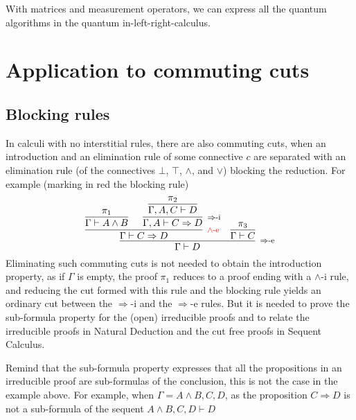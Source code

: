 \documentclass[screen, sigconf,authorversion,nonacm]{acmart}
\theoremstyle{acmdefinition}
\numberwithin{equation}{section}
\newcommand\irule[3]{\infer[\mbox{\footnotesize $#3$}]{#2}{#1}}
\begin{document}
With matrices and measurement operators, we can express all the quantum
algorithms in the quantum in-left-right-calculus.


\section{Application to commuting cuts}\label{sec:commutingcuts}

\subsection{Blocking rules}
  
In calculi with no interstitial rules, there are also commuting cuts,
when an introduction and an elimination rule of some connective $c$
are separated with an elimination rule (of the connectives $\bot$,
$\top$, $\wedge$, and $\vee$) blocking the reduction. For example
(marking in red the blocking rule)
$$\irule{\irule{\irule{\pi_1}{\Gamma \vdash A \wedge B}{}
                &
                \irule{\irule{\pi_2}
                             {\Gamma, A, C \vdash D}
                             {}
                      }
                      {\Gamma, A \vdash C \Rightarrow D}
                      {\mbox{$\Rightarrow$-i}}
               }
               {\Gamma \vdash C \Rightarrow D}
               {\mbox{\color{red} $\wedge$-e}}
         &
         \irule{\pi_3}
               {\Gamma \vdash C}
               {}
       }
       {\Gamma \vdash D}
       {\mbox{$\Rightarrow$-e}}$$
Eliminating such commuting cuts is not needed to obtain the
introduction property, as if $\Gamma$ is empty, the proof $\pi_1$
reduces to a proof ending with a $\wedge$-i rule, and reducing the cut
formed with this rule and the blocking rule yields an
ordinary cut between the $\Rightarrow$-i and the $\Rightarrow$-e
rules.  But it is needed to prove the sub-formula property for the
(open) irreducible proofs and to relate the irreducible proofs in
Natural Deduction and the cut free proofs in Sequent Calculus.

Remind that the sub-formula property expresses that all the
propositions in an irreducible proof are sub-formulas of the
conclusion, this is not the case in the example above. For example,
when $\Gamma = A\wedge B,C,D$, as the proposition $C\Rightarrow D$ is
not a sub-formula of the sequent $A\wedge B,C,D\vdash D$
\end{document}
